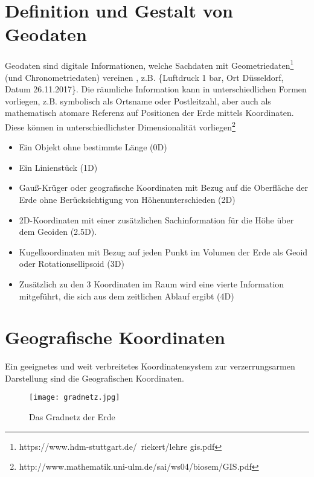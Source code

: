 \documentclass[11pt,ceqn]{book}
\begin{document}
\section{Definition und Gestalt von Geodaten}
Geodaten sind digitale Informationen, welche Sachdaten mit Geometriedaten\footnote{https://www.hdm-stuttgart.de/~riekert/lehre gis.pdf} (und Chronometriedaten) vereinen , z.B. \{Luftdruck 1 bar, Ort Düsseldorf, Datum 26.11.2017\}. 
Die räumliche Information kann in unterschiedlichen Formen vorliegen, z.B. symbolisch als Ortsname oder Postleitzahl, aber auch als mathematisch atomare Referenz auf Positionen der Erde mittels Koordinaten. Diese können in unterschiedlichster Dimensionalität vorliegen\footnote{http://www.mathematik.uni-ulm.de/sai/ws04/biosem/GIS.pdf}
\begin{itemize}
\item Ein Objekt ohne bestimmte Länge (0D)
\item Ein Linienstück (1D)
\item
Gauß-Krüger oder geografische Koordinaten mit Bezug auf die Oberfläche der Erde ohne Berücksichtigung von Höhenunterschieden (2D)
\item 
2D-Koordinaten mit einer zusätzlichen Sachinformation für die Höhe über dem Geoiden (2.5D).
\item Kugelkoordinaten mit Bezug auf jeden Punkt im Volumen der Erde als
Geoid oder Rotationsellipsoid (3D)
\item 
Zusätzlich zu den 3 Koordinaten im Raum wird eine vierte
Information mitgeführt, die sich aus dem zeitlichen Ablauf ergibt (4D)
\end{itemize}


\newpage

\section{Geografische Koordinaten}
Ein geeignetes und weit verbreitetes Koordinatensystem zur verzerrungsarmen Darstellung sind die Geografischen Koordinaten. 

\begin{figure}[H]
\centering
\texttt{[image: gradnetz.jpg]}
\caption{Das Gradnetz der Erde}\label{gradnetz}
\end{figure}
\end{document}
